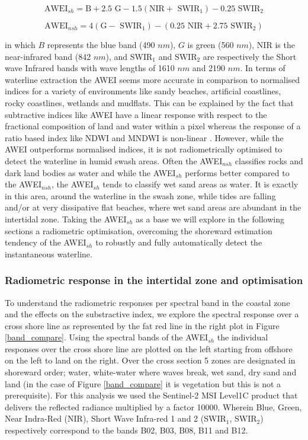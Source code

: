 \documentclass[remotesensing,article,submit,pdftex,moreauthors]{Definitions/mdpi}
\begin{document}
\begin{equation}
    \textrm{AWEI$_{sh}$} = \textrm{B} + 2.5\textrm{ G} - 1.5 (\textrm{NIR} + \textrm{ SWIR$_{1}$}) - 0.25 \textrm{ SWIR$_{2}$}
\end{equation}

\begin{equation}
    \textrm{AWEI$_{nsh}$} = 4 (\textrm{G} - \textrm{ SWIR$_{1}$}) - (0.25 \textrm{ NIR} + 2.75 \textrm{ SWIR$_{2}$})
\end{equation}

in which $B$ represents the blue band (490 $nm$), $G$ is green (560 $nm$), NIR is the near-infrared band (842 $nm$), and SWIR$_{1}$ and SWIR$_{2}$ are respectively the Short wave Infrared bands with wave lengths of 1610 $nm$ and 2190 $nm$. In terms of waterline extraction the AWEI seems more accurate in comparison to normalised indices for a variety of environments like sandy beaches, artificial coastlines, rocky coastlines, wetlands and mudflats. This can be explained by the fact that subtractive indices like AWEI have a linear response with respect to the fractional composition of land and water within a pixel whereas the response of a ratio based index like NDWI and MNDWI is non-linear \citep{Bishop_sub_pixel}. However, while the AWEI outperforms normalised indices, it is not radiometrically optimised to detect the waterline in humid swash areas. Often the AWEI$_{nsh}$ classifies rocks and dark land bodies as water and while the AWEI$_{sh}$ performs better compared to the AWEI$_{nsh}$, the AWEI$_{sh}$ tends to classify wet sand areas as water. It is exactly in this area, around the waterline in the swash zone, while tides are falling and/or at very dissipative flat beaches, where wet sand areas are abundant in the intertidal zone. Taking the AWEI$_{sh}$ as a base we will explore in the following sections a radiometric optimisation, overcoming the shoreward estimation tendency of the AWEI$_{sh}$ to robustly and fully automatically detect the instantaneous waterline.

\subsubsection{Radiometric response in the intertidal zone and optimisation}
To understand the radiometric responses per spectral band in the coastal zone and the effects on the substractive index, we explore the spectral response over a cross shore line as represented by the fat red line in the right plot in Figure \ref{band_compare}. Using the spectral bands of the AWEI$_{sh}$ the individual responses over the cross shore line are plotted on the left starting from offshore on the left to land on the right. Over the cross section 5 zones are designated in shoreward order; water, white-water where waves break, wet sand, dry sand and land (in the case of Figure \ref{band_compare} it is vegetation but this is not a prerequisite). For this analysis we used the Sentinel-2 MSI Level1C product that delivers the reflected radiance multiplied by a factor 10000. Wherein Blue, Green, Near Indra-Red (NIR), Short Wave Infra-red 1 and 2 (SWIR$_{1}$, SWIR$_{2}$) respectively correspond to the bands B02, B03, B08, B11 and B12.
\end{document}
